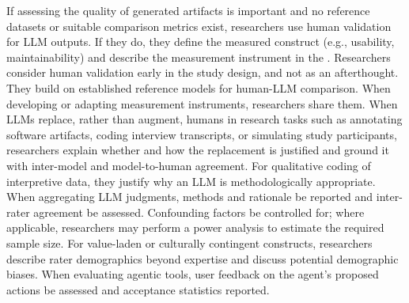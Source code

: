 If assessing the quality of generated artifacts is important and no reference datasets or suitable comparison metrics exist, researchers \should use human validation for LLM outputs. If they do, they \must define the measured construct (e.g., usability, maintainability) and describe the measurement instrument in the \paper. Researchers \should consider human validation early in the study design, and not as an afterthought. They \should build on established reference models for human-LLM comparison. When developing or adapting measurement instruments, researchers \must share them. When LLMs replace, rather than augment, humans in research tasks such as annotating software artifacts, coding interview transcripts, or simulating study participants, researchers \must explain whether and how the replacement is justified and \should ground it with inter-model and model-to-human agreement. For qualitative coding of interpretive data, they \should justify why an LLM is methodologically appropriate. When aggregating LLM judgments, methods and rationale \should be reported and inter-rater agreement \should be assessed. Confounding factors \should be controlled for; where applicable, researchers may perform a power analysis to estimate the required sample size. For value-laden or culturally contingent constructs, researchers \should describe rater demographics beyond expertise and discuss potential demographic biases. When evaluating agentic tools, user feedback on the agent's proposed actions \should be assessed and acceptance statistics reported.
